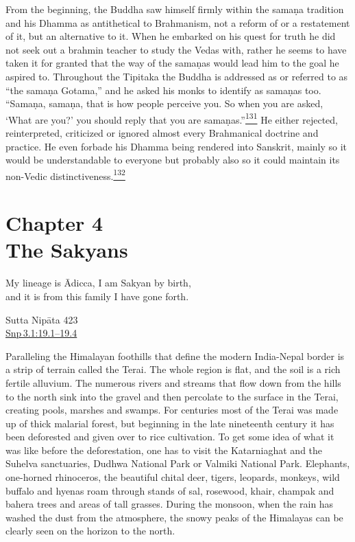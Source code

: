From the beginning, the Buddha saw himself firmly within the samaṇa
tradition and his Dhamma as antithetical to Brahmanism, not a reform of
or a restatement of it, but an alternative to it. When he embarked on
his quest for truth he did not seek out a brahmin teacher to study the
Vedas with, rather he seems to have taken it for granted that the way of
the samaṇas would lead him to the goal he aspired to. Throughout the
Tipitaka the Buddha is addressed as or referred to as ``the samaṇa
Gotama,'' and he asked his monks to identify as samaṇas too. ``Samaṇa,
samaṇa, that is how people perceive you. So when you are asked, `What
are you?' you should reply that you are
samaṇas.''\label{footprints_split_007.html_fnref131}\hyperref[footprints_split_024.htmlux5cux23fn131]{\textsuperscript{131}}
He either rejected, reinterpreted, criticized or ignored almost every
Brahmanical doctrine and practice. He even forbade his Dhamma being
rendered into Sanskrit, mainly so it would be understandable to everyone
but probably also so it could maintain its non-Vedic
distinctiveness.\label{footprints_split_007.html_fnref132}\hyperref[footprints_split_024.htmlux5cux23fn132]{\textsuperscript{132}}

\label{footprints_split_007.html_calibre_pb_15}

\label{footprints_split_008.html}{}

\section{\texorpdfstring{{Chapter 4}\\
The
Sakyans}{Chapter 4 The Sakyans}}\label{footprints_split_008.html_TOCTarget4}

My lineage is Ādicca, I am Sakyan by birth,\\
and it is from this family I have gone forth.

Sutta Nipāta 423\\
\href{https://suttacentral.net/snp3.1/en/sujato\#19.1}{Snp\,3.1:19.1--19.4}

Paralleling the Himalayan foothills that define the modern India-Nepal
border is a strip of terrain called the Terai. The whole region is flat,
and the soil is a rich fertile alluvium. The numerous rivers and streams
that flow down from the hills to the north sink into the gravel and then
percolate to the surface in the Terai, creating pools, marshes and
swamps. For centuries most of the Terai was made up of thick malarial
forest, but beginning in the late nineteenth century it has been
deforested and given over to rice cultivation. To get some idea of what
it was like before the deforestation, one has to visit the Katarniaghat
and the Suhelva sanctuaries, Dudhwa National Park or Valmiki National
Park. Elephants, one-horned rhinoceros, the beautiful chital deer,
tigers, leopards, monkeys, wild buffalo and hyenas roam through stands
of sal, rosewood, khair, champak and bahera trees and areas of tall
grasses. During the monsoon, when the rain has washed the dust from the
atmosphere, the snowy peaks of the Himalayas can be clearly seen on the
horizon to the north.

